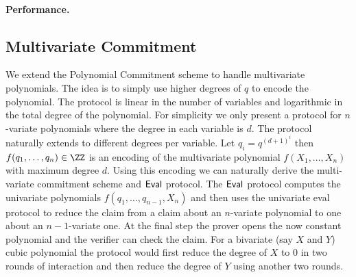 \documentclass{article}
\theoremstyle{definition}
\begin{document}
\paragraph{Performance.}

\subsection{Multivariate Commitment}\label{section:multivariate}
  We extend the Polynomial Commitment scheme to handle multivariate polynomials. The idea is to simply use higher degrees of $q$ to encode the polynomial. The protocol is linear in the number of variables and logarithmic in the total degree of the polynomial. For simplicity we only present a protocol for $n$-variate polynomials where the degree in each variable is $d$. The protocol naturally extends to different degrees per variable.
Let $q_i=q^{(d+1)^i}$ then $f(q_1,\dots,q_n)\in \ZZ$ is an encoding of the multivariate polynomial $f(X_1,\dots,X_n)$ with maximum degree $d$. Using this encoding we can naturally derive the multi-variate commitment scheme and $\textsf{{Eval}}$ protocol. The $\textsf{{Eval}}$ protocol  computes the univariate polynomials $f(q_1,\dots,q_{n-1},X_n)$ and then uses the univariate eval protocol to reduce the claim from a claim about an $n$-variate polynomial to one about an $n-1$-variate one. At the final step the prover opens the now constant polynomial and the verifier can check the claim. For a bivariate (say $X$ and $Y$) cubic polynomial the protocol would first reduce the degree of $X$ to $0$ in two rounds of interaction and then reduce the degree of $Y$ using another two rounds.
 
\end{document}
